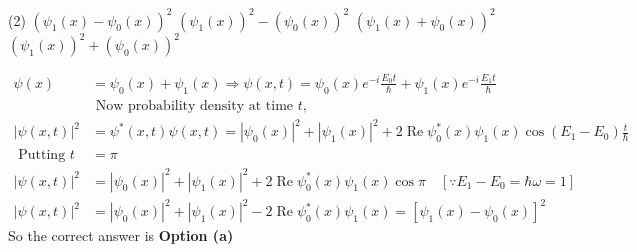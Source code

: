 \begin{enumerate}
 \begin{tasks}(2)
	\task[\textbf{a.}]$\left(\psi_{1}(x)-\psi_{0}(x)\right)^{2}$
	\task[\textbf{b.}]$\left(\psi_{1}(x)\right)^{2}-\left(\psi_{0}(x)\right)^{2}$
	\task[\textbf{c.}]$\left(\psi_{1}(x)+\psi_{0}(x)\right)^{2}$
	\task[\textbf{d.}] $\left(\psi_{1}(x)\right)^{2}+\left(\psi_{0}(x)\right)^{2}$
\end{tasks}
\begin{answer}
	$$
	\begin{aligned}
	\psi(x)&=\psi_{0}(x)+\psi_{1}(x) \Rightarrow \psi(x, t)=\psi_{0}(x) e^{-i} \frac{E_{0} t}{\hbar}+\psi_{1}(x) e^{-i} \frac{E_{1} t}{\hbar}\\
	&\text { Now probability density at time } t \text {, }\\
	|\psi(x, t)|^{2}&=\psi^{*}(x, t) \psi(x, t)=\left|\psi_{0}(x)\right|^{2}+\left|\psi_{1}(x)\right|^{2}+2 \operatorname{Re} \psi_{0}^{*}(x) \psi_{1}(x) \cos \left(E_{1}-E_{0}\right) \frac{t}{\hbar}\\
	 \text { Putting } t&=\pi\\
	|\psi(x, t)|^{2}&=\left|\psi_{0}(x)\right|^{2}+\left|\psi_{1}(x)\right|^{2}+2 \operatorname{Re} \psi_{0}^{*}(x) \psi_{1}(x) \cos \pi \quad\left[\because E_{1}-E_{0}=\hbar \omega=1\right]\\
	|\psi(x, t)|^{2}&=\left|\psi_{0}(x)\right|^{2}+\left|\psi_{1}(x)\right|^{2}-2 \operatorname{Re} \psi_{0}^{*}(x) \psi_{1}(x)=\left[\psi_{1}(x)-\psi_{0}(x)\right]^{2}
\end{aligned}
$$
So the correct answer is \textbf{Option (a)}
\end{answer}
\end{enumerate}